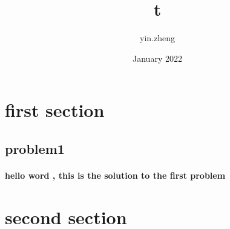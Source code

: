 \documentclass{article}
\title{t}
\author{yin.zheng }
\date{January 2022}
\begin{document}
\maketitle

\section{first section}
\subsection{problem1}
\paragraph{ hello word , this is the solution to the first problem}
\section{second section}
\end{document}
